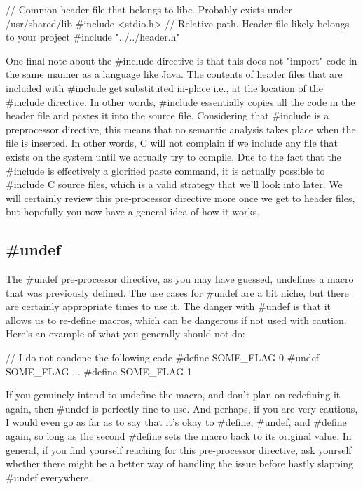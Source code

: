 \documentclass{article}
\begin{document}
\begin{cblk}
// Common header file that belongs to libc. Probably exists under /usr/shared/lib
#include <stdio.h>
// Relative path. Header file likely belongs to your project
#include "../../header.h"
\end{cblk}

One final note about the \#include directive is that this does not "import" code in the same manner as a
language like Java. The contents of header files that are included with \#include get substituted in-place
i.e., at the location of the \#include directive. In other words, \#include essentially copies all the code in
the header file and pastes it into the source file. Considering that \#include is a preprocessor directive,
this means that no semantic analysis takes place when the file is inserted. In other words, C will not
complain if we include any file that exists on the system until we actually try to compile. Due to the fact that
the \#include is effectively a glorified paste command, it is actually possible to \#include C source files,
which is a valid strategy that we'll look into later. We will certainly review this pre-processor directive more
once we get to header files, but hopefully you now have a general idea of how it works.

\subsection{\#undef}

The \#undef pre-processor directive, as you may have guessed, undefines a macro that was previously defined.
The use cases for \#undef are a bit niche, but there are certainly appropriate times to use it. The danger
with \#undef is that it allows us to re-define macros, which can be dangerous if not used with caution. Here's
an example of what you generally should not do:

\begin{cblk}
// I do not condone the following code
#define SOME_FLAG 0
#undef SOME_FLAG
...
#define SOME_FLAG 1
\end{cblk}

If you genuinely intend to undefine the macro, and don't plan on redefining it again, then \#undef is
perfectly fine to use. And perhaps, if you are very cautious, I would even go as far as to say that it's okay
to \#define, \#undef, and \#define again, so long as the second \#define sets the macro back to its original
value. In general, if you find yourself reaching for this pre-processor directive, ask yourself whether there
might be a better way of handling the issue before hastly slapping \#undef everywhere.
\end{document}
